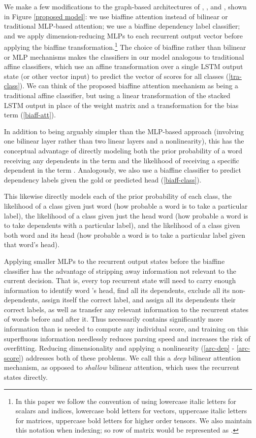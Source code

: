 \documentclass[11pt,a4paper]{article}
\begin{document}
We make a few modifications to the graph-based architectures of \citet{KiperwasserGoldberg2016}, \citet{Hashimotoetal2016}, and \citet{Chengetal2016}, shown in Figure \ref{proposed model}: we use biaffine attention instead of bilinear or traditional MLP-based attention; we use a biaffine dependency label classifier; and we apply dimension-reducing MLPs to each recurrent output vector  before applying the biaffine transformation.\footnote{In this paper we follow the convention of using lowercase italic letters for scalars and indices, lowercase bold letters for vectors, uppercase italic letters for matrices, uppercase bold letters for higher order tensors. We also maintain this notation when indexing; so row  of matrix  would be represented as .} The choice of biaffine rather than bilinear or MLP mechanisms makes the classifiers in our model analogous to traditional affine classifiers, which use an affine transformation over a single LSTM output state  (or other vector input) to predict the vector of scores  for all classes (\ref{tra-class}). We can think of the proposed biaffine attention mechanism as being a traditional affine classifier, but using a  linear transformation of the stacked LSTM output  in place of the weight matrix  and a  transformation  for the bias term  (\ref{biaff-att}). 

In addition to being arguably simpler than the MLP-based approach (involving one bilinear layer rather than two linear layers and a nonlinearity), this has the conceptual advantage of directly modeling both the prior probability of a word  receiving any dependents in the term  and the likelihood of  receiving a specific dependent  in the term . Analogously, we also use a biaffine classifier to predict dependency labels given the gold or predicted head  (\ref{biaff-class}).

This likewise directly models each of the prior probability of each class, the likelihood of a class given just word  (how probable a word is to take a particular label), the likelihood of a class given just the head word  (how probable a word is to take dependents with a particular label), and the likelihood of a class given both word  and its head (how probable a word is to take a particular label given that word's head). 
 
Applying smaller MLPs to the recurrent output states before the biaffine classifier has the advantage of stripping away information not relevant to the current decision. That is, every top recurrent state  will need to carry enough information to identify word 's head, find all its dependents, exclude all its non-dependents, assign itself the correct label, and assign all its dependents their correct labels, as well as transfer any relevant information to the recurrent states of words before and after it. Thus  necessarily contains significantly more information than is needed to compute any individual score, and training on this superfluous information needlessly reduces parsing speed and increases the risk of overfitting. Reducing dimensionality and applying a nonlinearity (\ref{arc-dep} - \ref{arc-score}) addresses both of these problems. We call this a \emph{deep} bilinear attention mechanism, as opposed to \emph{shallow} bilinear attention, which uses the recurrent states directly.
\end{document}
